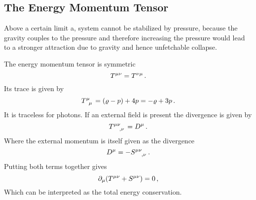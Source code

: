 \subsection{The Energy Momentum Tensor}
\begin{sidenote}
Above a certain limit a, system cannot be stabilized by pressure, because the
gravity couples to the pressure and therefore increasing the pressure would lead
to a stronger attraction due to gravity and hence unfetchable collapse.
\end{sidenote}
The energy momentum tensor is symmetric
\begin{equation}
    \tensor{T}{^\mu^\nu}=\tensor{T}{^\nu^\mu}\, .
\end{equation}
Its trace is given by
\begin{equation}
    \tensor{T}{^\mu_\mu}=(\varrho-p)+4p=-\varrho+3p\, .
\end{equation}
It is traceless for photons. If an external field is present the divergence is
given by
\begin{equation}
    \tensor{T}{^\mu^\nu_,_\nu}=\tensor{D}{^\mu}\,  .
\end{equation}
Where the external momentum is itself given as the divergence
\begin{equation}
    \tensor{D}{^\mu} =-\tensor{S}{^\mu^\nu_,_\nu}\, .
\end{equation}
Putting both terms together gives
\begin{equation}
    \partial_\mu(\tensor{T}{^\mu^\nu}+\tensor{S}{^\mu^\nu})=0\,,
\end{equation}
Which can be interpreted as the total energy conservation.
